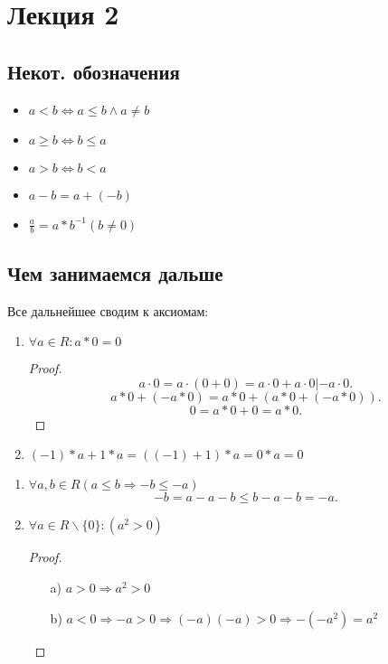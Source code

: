 \section{Лекция 2}

\subsection{Некот. обозначения}
\begin{itemize}
    \item $a < b \iff a \leq b  \land  a \neq b$
    \item $a \geq b \iff b \leq a$
    \item $a > b \iff b < a$
    \item $ a - b = a + (-b) $
    \item $\frac{a}{b} = a * b^{-1} (b\neq0)$
\end{itemize}

\subsection{Чем занимаемся дальше}
Все дальнейшее сводим к аксиомам:
\begin{example}
\begin{enumerate}
    \item $\forall a  \in R \colon a * 0 = 0$
        \begin{proof}
            \[
        a \cdot  0 = a \cdot (0 + 0) = a \cdot  0 + a \cdot  0     | -a\cdot  0
            .\] 
            \[
            a * 0 + (-a * 0) = a * 0 + (a * 0 + (-a * 0))
            .\] 
            \[
            0 = a * 0 + 0 = a * 0
            .\] 
        \end{proof}
    \item $(-1) * a + 1 * a = ((-1) + 1) * a = 0 * a = 0$
\end{enumerate}
\end{example}
\begin{example}
\begin{enumerate}
    \item $\forall a, b  \in R (a \leq b \Rightarrow -b \leq -a)$ 
        \[
        -b = a - a - b \leq b - a - b = -a
        .\] 
    \item $\forall a  \in  R \backslash \{0\} \colon  (a^{2} > 0)$ 
        \begin{proof}
        \begin{itemize}
            \item [a) ] $a > 0 \Rightarrow a^{2} > 0$
            \item [b) ] $a < 0 \Rightarrow -a > 0 \Rightarrow (-a)(-a) > 0 \Rightarrow -(-a^{2}) = a^{2}$
        \end{itemize}
        \end{proof}
        
\end{enumerate}
\end{example}

